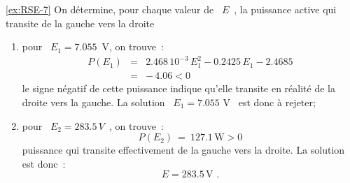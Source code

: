 \begin{solexercise}{\ref{ex:RSE-7}}
On détermine, pour chaque valeur de \ $E$~, la puissance active qui
transite de la gauche vers la droite
\begin{enumerate}
	\item pour \ $E_1 = 7.055$~V, on trouve~:
	\begin{eqnarray*}
		P(E_1) &=& 2.468\, 10^{-3} \, E_1^2 - 0.2425\, E_1 - 2.4685\\
		&=& -\, 4.06 < 0 
	\end{eqnarray*}
	le signe négatif de cette puissance indique qu'elle transite en
	réalité de la droite vers la gauche. La solution \ $E_1 = 7.055$ V \
	est donc à rejeter;
	\item pour \ $E_2 = 283.5\, V$~, on trouve~:
	\[ P(E_2) \: = \: 127.1 \, \text{W} > 0 \]
	puissance qui transite effectivement de la gauche vers la droite. La solution est donc~:
	\[ E = 283.5\, \text{V~.} \]
\end{enumerate}



\end{solexercise}
